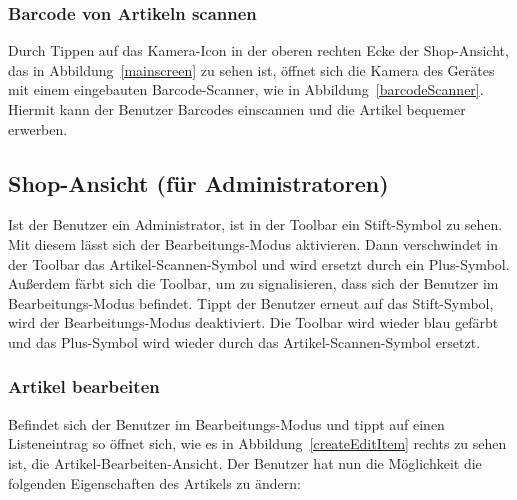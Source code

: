 
\subsubsection{Barcode von Artikeln scannen} \label{subsubsec:shop-scan-item}

Durch Tippen auf das Kamera-Icon in der oberen rechten Ecke der Shop-Ansicht, das in Abbildung~\ref{mainscreen} zu sehen ist, öffnet sich die Kamera des Gerätes mit einem eingebauten Barcode-Scanner, wie in Abbildung~\ref{barcodeScanner}.
Hiermit kann der Benutzer Barcodes einscannen und die Artikel bequemer erwerben.


\subsection{Shop-Ansicht (für Administratoren)} \label{subsec:shop-screen-admin}

Ist der Benutzer ein Administrator, ist in der Toolbar ein Stift-Symbol zu sehen.
Mit diesem lässt sich der Bearbeitungs-Modus aktivieren.
Dann verschwindet in der Toolbar das Artikel-Scannen-Symbol und wird ersetzt durch ein Plus-Symbol.
Außerdem färbt sich die Toolbar, um zu signalisieren, dass sich der Benutzer im Bearbeitungs-Modus befindet.
Tippt der Benutzer erneut auf das Stift-Symbol, wird der Bearbeitungs-Modus deaktiviert.
Die Toolbar wird wieder blau gefärbt und das Plus-Symbol wird wieder durch das Artikel-Scannen-Symbol ersetzt.

\subsubsection{Artikel bearbeiten} \label{subsubsec:shop-edit-items}

Befindet sich der Benutzer im Bearbeitungs-Modus und tippt auf einen Listeneintrag so öffnet sich, wie es in Abbildung~\ref{createEditItem} rechts zu sehen ist, die Artikel-Bearbeiten-Ansicht.
Der Benutzer hat nun die Möglichkeit die folgenden Eigenschaften des Artikels zu ändern:

